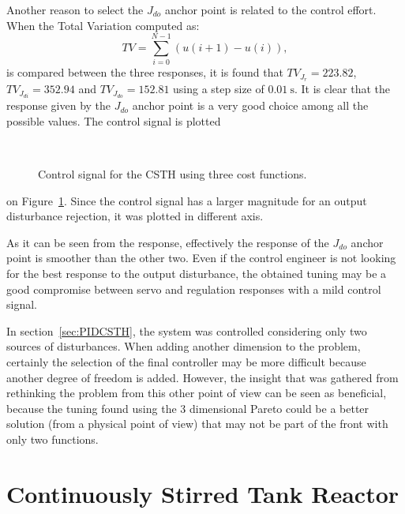 Another reason to select the $J_{do}$ anchor point is related to the control effort. When the Total Variation computed as:
\begin{equation*}
TV = \sum_{i=0}^{N-1}\left(  u(i+1)-u(i)\right),
\end{equation*}
is compared between the three responses, it is found that $TV_{J_r} = 223.82$, $TV_{J_{di}} = 352.94$ and $TV_{J_{do}} = 152.81$ using a step size of $\SI{0.01}{\second}$. It is clear that the response given by the $J_{do}$ anchor point is a very good choice among all the possible values. The control signal is plotted %
%
\begin{figure}[tb]
	\centering
	\\
	\caption{Control signal for the CSTH using three cost functions.}
	\label{fig:Ch7CSTHControlledCV3Fun}
\end{figure}
%
on Figure~\ref{fig:Ch7CSTHControlledCV3Fun}. Since the control signal has a larger magnitude for an output disturbance rejection, it was plotted in different axis.

As it can be seen from the response, effectively the response of the $J_{do}$ anchor point is smoother than the other two. Even if the control engineer is not looking for the best response to the output disturbance, the obtained tuning may be a good compromise between servo and regulation responses with a mild control signal.

In section~\ref{sec:PIDCSTH}, the system was controlled considering only two sources of disturbances. When adding another dimension to the problem, certainly the selection of the final controller may be more difficult because another degree of freedom is added. However, the insight that was gathered from rethinking the problem from this other point of view can be seen as beneficial, because the tuning found using the 3 dimensional Pareto could be a better solution (from a physical point of view) that may not be part of the front with only two functions.
%
%
\section{Continuously Stirred Tank Reactor}
\label{sec:CSTRVandeVusse}
%

